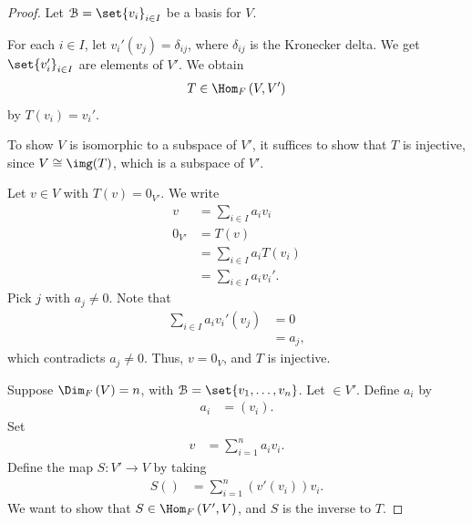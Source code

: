 \documentclass[10pt]{mypackage}
\begin{document}
\begin{proof}
  Let $\mathcal{B} = \set{v_i}_{i\in I}$ be a basis for $V$.\newline

  For each $i\in I$, let $v_i'(v_j) = \delta_{ij}$, where $\delta_{ij}$ is the Kronecker delta. We get $\set{v_i'}_{i\in I}$ are elements of $V'$. We obtain
  \begin{align*}
    T\in \Hom_{F}\left(V,V'\right)
  \end{align*}
  by $T\left(v_i\right) = v_i'$.\newline

  To show $V$ is isomorphic to a subspace of $V'$, it suffices to show that $T$ is injective, since $V\cong \img(T)$, which is a subspace of $V'$.\newline

  Let $v\in V$ with $T(v) = 0_{V'}$. We write
  \begin{align*}
    v &= \sum_{i\in I}a_iv_i\\
    0_{V'}&= T(v)\\
                    &= \sum_{i\in I}a_iT\left(v_i\right)\\
                    &= \sum_{i\in I}a_iv_i'.
  \end{align*}
  Pick $j$ with $a_j\neq 0$. Note that
  \begin{align*}
    \sum_{i\in I}a_iv_i'(v_j) &= 0\\
                              &= a_j,
  \end{align*}
  which contradicts $a_j\neq 0$. Thus, $v = 0_V$, and $T$ is injective.\newline

  Suppose $\Dim_{F}\left(V\right) = n$, with $\mathcal{B} = \set{v_1,\dots,v_n}$. Let $\in V'$. Define $a_i$ by
  \begin{align*}
    a_i &= \left(v_i\right).
  \end{align*}
  Set
  \begin{align*}
    v &= \sum_{i=1}^{n}a_iv_i.
  \end{align*}
  Define the map $S: V'\rightarrow V$ by taking
  \begin{align*}
    S\left(\right) &= \sum_{i=1}^{n}\left(v'\left(v_i\right)\right)v_i.
  \end{align*}
  We want to show that $S\in \Hom_{F}\left(V',V\right)$, and $S$ is the inverse to $T$.\newline


\end{proof}
\end{document}

